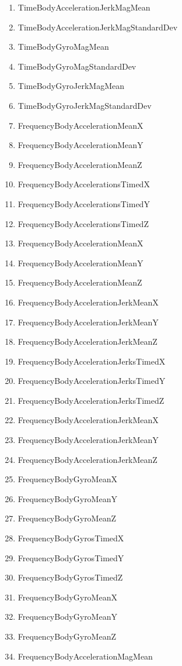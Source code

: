 \documentclass{article}
\begin{document}
\begin{enumerate}
	\item	TimeBodyAccelerationJerkMagMean
	\item	TimeBodyAccelerationJerkMagStandardDev
	\item	TimeBodyGyroMagMean
	\item	TimeBodyGyroMagStandardDev
	\item	TimeBodyGyroJerkMagMean
	\item	TimeBodyGyroJerkMagStandardDev
	\item	FrequencyBodyAccelerationMeanX
	\item	FrequencyBodyAccelerationMeanY
	\item	FrequencyBodyAccelerationMeanZ
	\item	FrequencyBodyAccelerationsTimedX
	\item	FrequencyBodyAccelerationsTimedY
	\item	FrequencyBodyAccelerationsTimedZ
	\item	FrequencyBodyAccelerationMeanX
	\item	FrequencyBodyAccelerationMeanY
	\item	FrequencyBodyAccelerationMeanZ
	\item	FrequencyBodyAccelerationJerkMeanX
	\item	FrequencyBodyAccelerationJerkMeanY
	\item	FrequencyBodyAccelerationJerkMeanZ
	\item	FrequencyBodyAccelerationJerksTimedX
	\item	FrequencyBodyAccelerationJerksTimedY
	\item	FrequencyBodyAccelerationJerksTimedZ
	\item	FrequencyBodyAccelerationJerkMeanX
	\item	FrequencyBodyAccelerationJerkMeanY
	\item	FrequencyBodyAccelerationJerkMeanZ
	\item	FrequencyBodyGyroMeanX
	\item	FrequencyBodyGyroMeanY
	\item	FrequencyBodyGyroMeanZ
	\item	FrequencyBodyGyrosTimedX
	\item	FrequencyBodyGyrosTimedY
	\item	FrequencyBodyGyrosTimedZ
	\item	FrequencyBodyGyroMeanX
	\item	FrequencyBodyGyroMeanY
	\item	FrequencyBodyGyroMeanZ
	\item	FrequencyBodyAccelerationMagMean

\end{enumerate}
\end{document}
